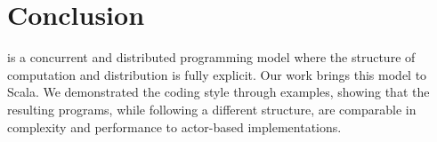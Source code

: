 \section*{Conclusion}
\apgas is a concurrent and distributed programming model where the structure of
computation and distribution is fully explicit. Our work brings this model to
Scala. We demonstrated the coding style through examples, showing that the
resulting programs, while following a different structure, are comparable in
complexity and performance to actor-based implementations.
